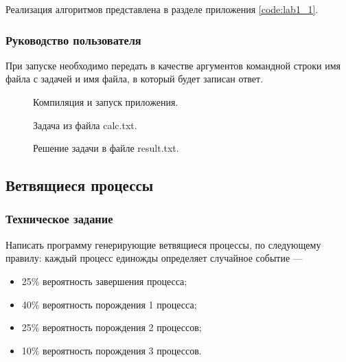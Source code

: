 \documentclass[a4paper,14pt]{extarticle}
\begin{document}
Реализация алгоритмов представлена в разделе приложения \ref{code:lab1_1}.

\subsubsection{Руководство пользователя}

При запуске необходимо передать в качестве аргументов командной строки имя файла с задачей и имя файла, в который будет записан ответ.

\begin{figure}[h]
\caption{Компиляция и запуск приложения.}
\label{1.png}
\end{figure}

\begin{figure}[h]
\caption{Задача из файла calc.txt.}
\label{1.png}
\end{figure}

\begin{figure}[h]
\caption{Решение задачи в файле result.txt.}
\label{1.png}
\end{figure}

\subsection{Ветвящиеся процессы}
\subsubsection{Техническое задание}
Написать программу генерирующие ветвящиеся процессы, по следующему правилу: каждый процесс единожды определяет случайное событие ---
\begin{itemize}
	\item 25\% вероятность завершения процесса; 
	\item 40\% вероятность порождения 1 процесса; 
	\item 25\% вероятность порождения 2 процессов; 
	\item 10\% вероятность порождения 3 процессов.
\end{itemize} 
\end{document}
